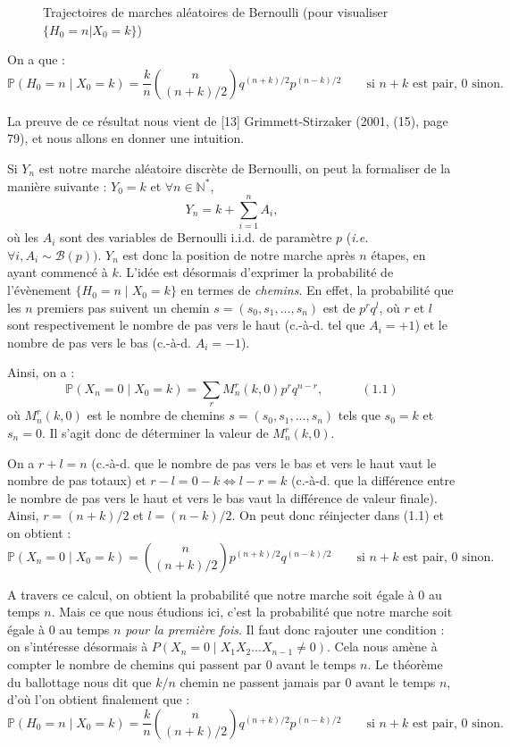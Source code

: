 \documentclass[12pt,a4paper]{article}
\begin{document}
\begin{figure}
    \caption{ Trajectoires de marches aléatoires de Bernoulli (pour visualiser $\{H_0=n | X_0=k\}$)}
  \end{figure}

On a que : $$ \mathbb{P}(H_0=n \mid X_0=k) = \frac{k}{n} {{n}\choose{(n+k)/2}} q^{(n+k)/2} p^{(n-k)/2}  \quad \quad \text{si } n+k \text{ est pair, 0 sinon.}$$

La preuve de ce résultat nous vient de [13] Grimmett-Stirzaker (2001, (15), page 79), et nous allons en donner une intuition. \par 
Si $Y_n$ est notre marche aléatoire discrète de Bernoulli, on peut la formaliser de la manière suivante : $Y_0=k$ et $\forall n \in \mathbb{N}^*$, $$Y_n = k + \sum_{i=1}^n A_i, $$ où les $A_i$ sont des variables de Bernoulli i.i.d. de paramètre $p$ (\textit{i.e.} $\forall i, A_i \sim \mathcal{B}(p))$. $Y_n$ est donc la position de notre marche après $n$ étapes, en ayant commencé à $k$. L'idée est désormais d'exprimer la probabilité de l'évènement $\{H_0=n \mid X_0=k \}$ en termes de \textit{chemins}. En effet, la probabilité que les $n$ premiers pas suivent un chemin $s = (s_0, s_1, ..., s_n)$ est de $p^r q^l$, où $r$ et $l$ sont respectivement le nombre de pas vers le haut (c.-à-d. tel que $A_i=+1$) et le nombre de pas vers le bas (c.-à-d. $A_i=-1$).\par 
Ainsi, on a : $$\mathbb{P}(X_n=0 \mid X_0=k) = \sum_r M_n^r(k,0) p^r q^{n-r}, \quad \quad \quad (1.1) $$ où $M_n^r(k,0)$ est le nombre de chemins $s = (s_0, s_1, ..., s_n)$ tels que $s_0=k$ et $s_n=0$. Il s'agit donc de déterminer la valeur de $M_n^r(k,0)$.\par 

On a $r+l=n$ (c.-à-d. que le nombre de pas vers le bas et vers le haut vaut le nombre de pas totaux) et $r-l = 0-k \Leftrightarrow l-r=k$ (c.-à-d. que la différence entre le nombre de pas vers le haut et vers le bas    vaut la différence de valeur finale). Ainsi, $r=(n+k)/2$ et $l=(n-k)/2$. On peut donc réinjecter dans (1.1) et on obtient : $$\mathbb{P}(X_n=0 \mid X_0=k) = {{n}\choose{(n+k)/2}} p^{(n+k)/2} q^{(n-k)/2} \quad \quad \text{si } n+k \text{ est pair, 0 sinon.} $$

A travers ce calcul, on obtient la probabilité que notre marche soit égale à 0 au temps $n$. Mais ce que nous étudions ici, c'est la probabilité que notre marche soit égale à 0 au temps $n$ \textit{pour la première fois}. Il faut donc rajouter une condition : on s'intéresse désormais à $P(X_n=0 \mid X_1X_2...X_{n-1} \neq 0)$. Cela nous amène à compter le nombre de chemins qui passent par 0 avant le temps $n$. Le théorème du ballottage nous dit que $k/n$ chemin ne passent jamais par 0 avant le temps $n$, d'où l'on obtient finalement que : 
$$ \mathbb{P}(H_0=n \mid X_0=k) = \frac{k}{n} {{n}\choose{(n+k)/2}} q^{(n+k)/2} p^{(n-k)/2}  \quad \quad \text{si } n+k \text{ est pair, 0 sinon.}$$\par 
\end{document}

